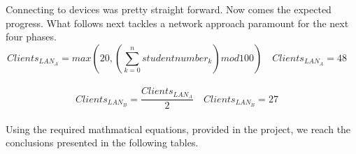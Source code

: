 \documentclass[11pt,a4paper]{report}
\begin{document}
        Connecting to devices was pretty straight forward. Now comes the expected progress. What follows next tackles a network approach paramount for the next four phases.\\
            \[
                Clients_{LAN_A} = max\left(20, \left(\sum_{k=0}^n studentnumber_k\right)mod 100\right)\quad
                Clients_{LAN_A} = 48\quad
            \] \\
            \[
                Clients_{LAN_B} = \frac{Clients_{LAN_A}}{2}\quad
                Clients_{LAN_B} = 27\quad
            \]\\

        Using the required mathmatical equations, provided in the project, we reach the conclusions presented in the following tables.\\
\end{document}
